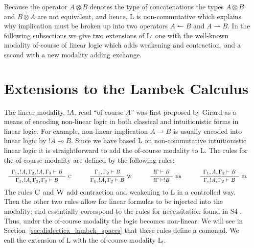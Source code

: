 \documentclass{llncs}
\newcommand{\LB}{\text{L}_!}
\newcommand{\Ldrule}[4][]{{\displaystyle\frac{\begin{array}{l}#2\end{array}}{#3}\quad\Ldrulename{#4}}}
\newcommand{\Lpremise}[1]{ #1 \\}
\newcommand{\Lnt}[1]{\mathit{#1}}
\newcommand{\Lsym}[1]{#1}
\newcommand{\Ldrulename}[1]{\textsc{#1}}
\newcommand{\LdruleCName}[0]{\Ldrulename{C}}
\newcommand{\LdruleC}[1]{\Ldrule[#1]{%
\Lpremise{ \Gamma_{{\mathrm{1}}}  \Lsym{,}   !  \Lnt{A}   \Lsym{,}  \Gamma_{{\mathrm{2}}}  \Lsym{,}   !  \Lnt{A}   \Lsym{,}  \Gamma_{{\mathrm{3}}}  \vdash  \Lnt{B} }%
}{
 \Gamma_{{\mathrm{1}}}  \Lsym{,}   !  \Lnt{A}   \Lsym{,}  \Gamma_{{\mathrm{2}}}  \Lsym{,}  \Gamma_{{\mathrm{3}}}  \vdash  \Lnt{B} }{%
{\LdruleCName}{}%
}}
\newcommand{\LdruleWName}[0]{\Ldrulename{W}}
\newcommand{\LdruleW}[1]{\Ldrule[#1]{%
\Lpremise{ \Gamma_{{\mathrm{1}}}  \Lsym{,}  \Gamma_{{\mathrm{2}}}  \vdash  \Lnt{B} }%
}{
 \Gamma_{{\mathrm{1}}}  \Lsym{,}   !  \Lnt{A}   \Lsym{,}  \Gamma_{{\mathrm{2}}}  \vdash  \Lnt{B} }{%
{\LdruleWName}{}%
}}
\newcommand{\LdruleBrName}[0]{\Ldrulename{Br}}
\newcommand{\LdruleBr}[1]{\Ldrule[#1]{%
\Lpremise{  !  \Gamma   \vdash  \Lnt{B} }%
}{
  !  \Gamma   \vdash   !  \Lnt{B}  }{%
{\LdruleBrName}{}%
}}
\newcommand{\LdruleBlName}[0]{\Ldrulename{Bl}}
\newcommand{\LdruleBl}[1]{\Ldrule[#1]{%
\Lpremise{ \Gamma_{{\mathrm{1}}}  \Lsym{,}  \Lnt{A}  \Lsym{,}  \Gamma_{{\mathrm{2}}}  \vdash  \Lnt{B} }%
}{
 \Gamma  \Lsym{,}   !  \Lnt{A}   \Lsym{,}  \Gamma_{{\mathrm{2}}}  \vdash  \Lnt{B} }{%
{\LdruleBlName}{}%
}}
\renewcommand{\Ldrule}[4][]{{\displaystyle\frac{\begin{array}{l}#2\end{array}}{#3}\,\,\Ldrulename{{\scriptsize #4}}}}
\begin{document}
Because the operator $ \Lnt{A}  \otimes  \Lnt{B} $ denotes the type of concatenations
the types $ \Lnt{A}  \otimes  \Lnt{B} $ and $ \Lnt{B}  \otimes  \Lnt{A} $ are not equivalent, and
hence, \textsf{L} is non-commutative which explains why implication
must be broken up into two operators $ \Lnt{A}  \leftharpoonup  \Lnt{B} $ and $ \Lnt{A}  \rightharpoonup  \Lnt{B} $.
In the following subsections we give two extensions of L: one with the
well-known modality of-course of linear logic which adds weakening and
contraction, and a second with a new modality adding exchange.

\section{
Extensions to the Lambek Calculus}
\label{subsec:the_lambek_calculus_with_the_weakening_and_contraction_modality}

The linear modality, $ !  \Lnt{A} $, read ``of-course $\Lnt{A}$'' was first
proposed by Girard \cite{Girard:1987} as a means of encoding
non-linear logic in both classical and intuitionistic forms in linear
logic.  For example, non-linear implication $ \Lnt{A}  \rightharpoonup  \Lnt{B} $ is usually
encoded into linear logic by $ !  \Lnt{A}  \multimap \Lnt{B}$. Since we have
based L on non-commutative intuitionistic linear logic it is
straightforward to add the of-course modality to L.  The rules for the
of-course modality are defined by the following rules:
\[
\small
\begin{array}{ccccccccccc}
  \LdruleC{} & \quad & \LdruleW{} & \quad & 
  \LdruleBr{} & \quad & \LdruleBl{}
\end{array}
\]
The rules $\Ldrulename{C}$ and $\Ldrulename{W}$ add contraction and
weakening to L in a controlled way.  Then the other two rules allow
for linear formulas to be injected into the modality; and essentially
correspond to the rules for necessitation found in S4
\cite{bierman2000}.  Thus, under the of-course modality the logic
becomes non-linear. We will see in
Section~\ref{sec:dialectica_lambek_spaces} that these rules define a
comonad.  We call the extension of L with the of-course modality
$\LB$.
\end{document}
